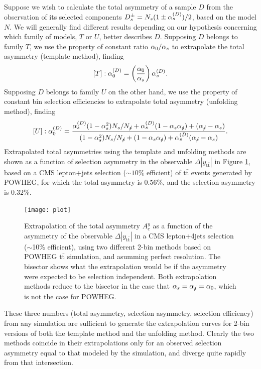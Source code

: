 \documentclass[letterpaper,11pt]{article}
\newcommand{\selected}{{\ensuremath s}}
\newcommand{\unselected}{{\ensuremath\slash\!\!\!\selected}}
\newcommand{\tot}{0}
\begin{document}
Suppose we wish to calculate the total asymmetry of a sample $D$ from
the observation of its selected components
$D_\selected^\pm=N_\selected(1\pm\alpha^{(D)}_\selected)/2$, based on
the model $N$.  We will generally find different results depending on
our hypothesis concerning which family of models, $T$ or $U$, better
describes $D$.  Supposing $D$ belongs to family $T$, we use the
property of constant ratio $\alpha_\tot/\alpha_\selected$ to
extrapolate the total asymmetry (template method), finding
\[[T]: \alpha_\tot^{(D)} = \left(\frac{\alpha_\tot}{\alpha_\selected}\right)\alpha^{(D)}_\selected.\]
Supposing $D$ belongs to family $U$ on the other hand, we use the
property of constant bin selection efficiencies to extrapolate total
asymmetry (unfolding method), finding
\[[U]: \alpha_\tot^{(D)} = \frac{\alpha^{(D)}_\selected(1-\alpha^2_\selected)N_\selected/N_\unselected + \alpha^{(D)}_\selected(1-\alpha_\selected\alpha_\unselected)+(\alpha_\unselected-\alpha_\selected)}{
                                                       (1-\alpha^2_\selected)N_\selected/N_\unselected + (1-\alpha_\selected\alpha_\unselected)+\alpha^{(D)}_\selected(\alpha_\unselected-\alpha_\selected)}{}.\]
%
Extrapolated total asymmetries using the template and unfolding
methods are shown as a function of selection asymmetry in the
observable $\Delta|y_{\mathrm{t\bar{t}}}|$ in Figure \ref{plot}, based
on a CMS lepton+jets selection ($\sim10\%$ efficient) of
$\mathrm{t\bar{t}}$ events generated by POWHEG, for which the total
asymmetry is $0.56\%$, and the selection asymmetry is $0.32\%$.
\begin{figure}
  \centering
  \texttt{[image: plot]}
  \caption{\label{plot} Extrapolation of the total asymmetry $A_c^y$
    as a function of the asymmetry of the observable
    $\Delta|y_{\mathrm{t\bar{t}}}|$ in a CMS lepton+4jets selection
    ($\sim$10\% efficient), using two different 2-bin methods based on
    {\sc POWHEG} $\mathrm{t\bar{t}}$ simulation, and asumming perfect
    resolution.  The bisector shows what the extrapolation would be if
    the asymmetry were expected to be selection independent.  Both
    extrapolation methods reduce to the bisector in the case that
    $\alpha_\selected=\alpha_\unselected=\alpha_\tot$, which is not
    the case for POWHEG.}
\end{figure}
These three numbers (total asymmetry, selection asymmetry, selection
efficiency) from any simulation are sufficient to generate the
extrapolation curves for 2-bin versions of both the template method
and the unfolding method.  Clearly the two methods coincide in their
extrapolations only for an observed selection asymmetry equal to that
modeled by the simulation, and diverge quite rapidly from that
intersection.
\end{document}
